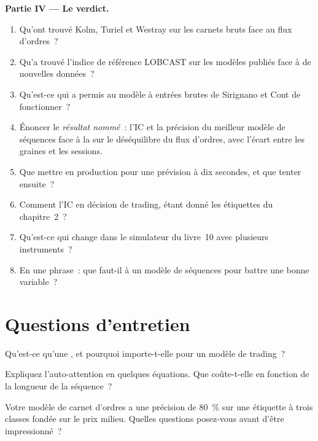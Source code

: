 \begin{problem}
\medskip\noindent\textbf{Partie IV --- Le verdict.}
\begin{enumerate}[resume]
\item Qu'ont trouvé Kolm, Turiel et Westray sur les carnets bruts face au flux d'ordres~?
\item Qu'a trouvé l'indice de référence LOBCAST sur les modèles publiés face à de nouvelles données~?
\item Qu'est-ce qui a permis au modèle à entrées brutes de Sirignano et Cont de fonctionner~?
\item Énoncer le \emph{résultat nommé}~: l'IC et la précision du meilleur modèle de séquences face à la  sur le déséquilibre du flux d'ordres,
avec l'écart entre les graines et les sessions.
\item Que mettre en production pour une prévision à dix secondes, et que tenter ensuite~?
\item Comment  l'IC en décision de trading, étant donné les étiquettes du chapitre~2~?
\item Qu'est-ce qui change dans le simulateur du livre~10 avec plusieurs instruments~?
\item En une phrase~: que faut-il à un modèle de séquences pour battre une bonne variable~?
\end{enumerate}
\end{problem}

\section{Questions d'entretien}

\begin{interviewq}\label{iq:ml:sequence-models-on-order-books:1}
Qu'est-ce qu'une , et pourquoi importe-t-elle pour un modèle de trading~?
\end{interviewq}

\begin{interviewq}\label{iq:ml:sequence-models-on-order-books:2}
Expliquez l'auto-attention en quelques équations. Que coûte-t-elle en fonction de la longueur de la séquence~?
\end{interviewq}

\begin{interviewq}\label{iq:ml:sequence-models-on-order-books:3}
Votre modèle de carnet d'ordres a une précision de 80~\% sur une étiquette à trois classes fondée sur le prix milieu. Quelles questions posez-vous avant d'être
impressionné~?
\end{interviewq}

